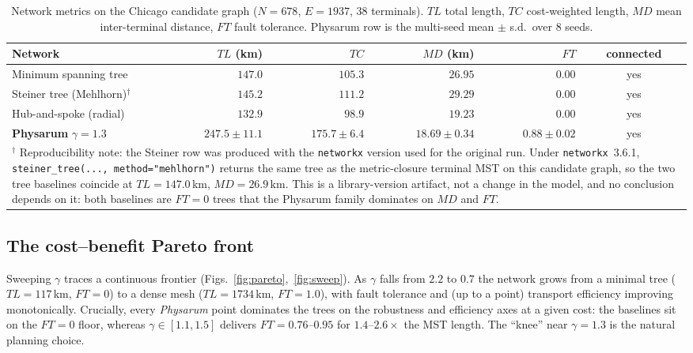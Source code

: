 \documentclass[11pt]{article}
\begin{document}
\begin{table}[t]
\centering
\caption{Network metrics on the Chicago candidate graph ($N=678$, $E=1937$, $38$ terminals).
$TL$ total length, $TC$ cost-weighted length, $MD$ mean inter-terminal distance, $FT$ fault
tolerance. Physarum row is the multi-seed mean $\pm$ s.d.\ over 8 seeds.}
\label{tab:metrics}
\begin{tabular}{lrrrrc}
\toprule
Network & $TL$ (km) & $TC$ & $MD$ (km) & $FT$ & connected \\
\midrule
Minimum spanning tree   & $147.0$ & $105.3$ & $26.95$ & $0.00$ & yes \\
Steiner tree (Mehlhorn)$^{\dagger}$ & $145.2$ & $111.2$ & $29.29$ & $0.00$ & yes \\
Hub-and-spoke (radial)  & $132.9$ & $\phantom{0}98.9$ & $19.23$ & $0.00$ & yes \\
\textbf{Physarum} $\gamma{=}1.3$ & $247.5\pm11.1$ & $175.7\pm6.4$ & $18.69\pm0.34$ & $0.88\pm0.02$ & yes \\
\bottomrule
\multicolumn{6}{p{0.95\linewidth}}{\footnotesize $^{\dagger}$ Reproducibility note: the
Steiner row was produced with the \texttt{networkx} version used for the original run.
Under \texttt{networkx}~3.6.1, \texttt{steiner\_tree(..., method="mehlhorn")} returns the
same tree as the metric-closure terminal MST on this candidate graph, so the two tree
baselines coincide at $TL=147.0$\,km, $MD=26.9$\,km. This is a library-version artifact,
not a change in the model, and no conclusion depends on it: both baselines are $FT=0$
trees that the Physarum family dominates on $MD$ and $FT$.}\\
\end{tabular}
\end{table}

\subsection{The cost--benefit Pareto front}
Sweeping $\gamma$ traces a continuous frontier (Figs.~\ref{fig:pareto},~\ref{fig:sweep}). As
$\gamma$ falls from $2.2$ to $0.7$ the network grows from a minimal tree ($TL=117$\,km,
$FT=0$) to a dense mesh ($TL=1734$\,km, $FT=1.0$), with fault tolerance and (up to a point)
transport efficiency improving monotonically. Crucially, every \emph{Physarum} point
dominates the trees on the robustness and efficiency axes at a given cost: the baselines sit
on the $FT=0$ floor, whereas $\gamma\in[1.1,1.5]$ delivers $FT=0.76$--$0.95$ for $1.4$--$2.6\times$
the MST length. The ``knee'' near $\gamma=1.3$ is the natural planning choice.
\end{document}
